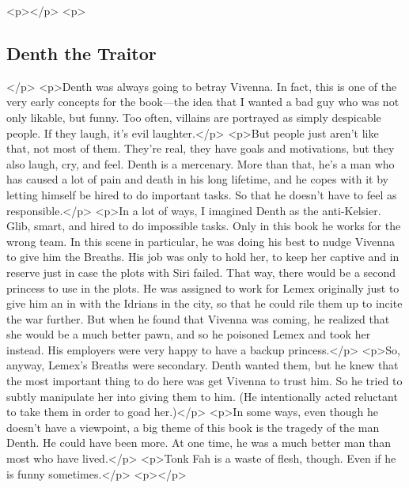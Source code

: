 <p></p>
<p>\subsection*{Denth the Traitor}</p>
<p>Denth was always going to betray Vivenna. In fact, this is one of the very early concepts for the book—the idea that I wanted a bad guy who was not only likable, but funny. Too often, villains are portrayed as simply despicable people. If they laugh, it’s evil laughter.</p>
<p>But people just aren’t like that, not most of them. They’re real, they have goals and motivations, but they also laugh, cry, and feel. Denth is a mercenary. More than that, he’s a man who has caused a lot of pain and death in his long lifetime, and he copes with it by letting himself be hired to do important tasks. So that he doesn’t have to feel as responsible.</p>
<p>In a lot of ways, I imagined Denth as the anti-Kelsier. Glib, smart, and hired to do impossible tasks. Only in this book he works for the wrong team. In this scene in particular, he was doing his best to nudge Vivenna to give him the Breaths. His job was only to hold her, to keep her captive and in reserve just in case the plots with Siri failed. That way, there would be a second princess to use in the plots. He was assigned to work for Lemex originally just to give him an in with the Idrians in the city, so that he could rile them up to incite the war further. But when he found that Vivenna was coming, he realized that she would be a much better pawn, and so he poisoned Lemex and took her instead. His employers were very happy to have a backup princess.</p>
<p>So, anyway, Lemex’s Breaths were secondary. Denth wanted them, but he knew that the most important thing to do here was get Vivenna to trust him. So he tried to subtly manipulate her into giving them to him. (He intentionally acted reluctant to take them in order to goad her.)</p>
<p>In some ways, even though he doesn’t have a viewpoint, a big theme of this book is the tragedy of the man Denth. He could have been more. At one time, he was a much better man than most who have lived.</p>
<p>Tonk Fah is a waste of flesh, though. Even if he is funny sometimes.</p>
<p></p>



